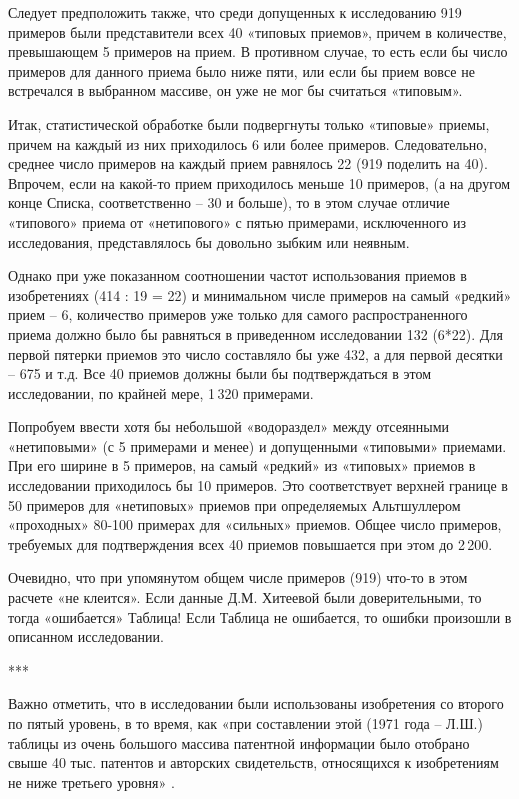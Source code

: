 \documentclass[11pt,a4paper]{article}
\begin{document}
Следует предположить также, что среди допущенных к исследованию 919 примеров
были представители всех 40 «типовых приемов», причем в количестве, превышающем
5 примеров на прием. В противном случае, то есть если бы число примеров для
данного приема было ниже пяти, или если бы прием вовсе не встречался в
выбранном массиве, он уже не мог бы считаться «типовым».

Итак, статистической обработке были подвергнуты только «типовые» приемы,
причем на каждый из них приходилось 6 или более примеров. Следовательно,
среднее число примеров на каждый прием равнялось 22 (919 поделить на 40).
Впрочем, если на какой-то прием приходилось меньше 10 примеров, (а на другом
конце Списка, соответственно -- 30 и больше), то в этом случае отличие
«типового» приема от «нетипового» с пятью примерами, исключенного из
исследования, представлялось бы довольно зыбким или неявным.

Однако при уже показанном соотношении частот использования приемов в
изобретениях (414 : 19 = 22) и минимальном числе примеров на самый «редкий»
прием -- 6, количество примеров уже только для самого распространенного приема
должно было бы равняться в приведенном исследовании 132 (6*22). Для первой
пятерки приемов это число составляло бы уже 432, а для первой десятки -- 675 и
т.д. Все 40 приемов должны были бы подтверждаться в этом исследовании, по
крайней мере, 1\,320 примерами.

Попробуем ввести хотя бы небольшой «водораздел» между отсеянными «нетиповыми»
(с 5 примерами и менее) и допущенными «типовыми» приемами. При его ширине в 5
примеров, на самый «редкий» из «типовых» приемов в исследовании приходилось бы
10 примеров. Это соответствует верхней границе в 50 примеров для «нетиповых»
приемов при определяемых Альтшуллером «проходных» 80-100 примерах для
«сильных» приемов. Общее число примеров, требуемых для подтверждения всех 40
приемов повышается при этом до 2\,200.

Очевидно, что при упомянутом общем числе примеров (919) что-то в этом расчете
«не клеится». Если данные Д.М. Хитеевой были доверительными, то тогда
«ошибается» Таблица! Если Таблица не ошибается, то ошибки произошли в
описанном исследовании.

\begin{center}  *** \end{center}

Важно отметить, что в исследовании были использованы изобретения со второго по
пятый уровень, в то время, как «при составлении этой (1971 года -- Л.Ш.)
таблицы из очень большого массива патентной информации было отобрано свыше 40
тыс. патентов и авторских свидетельств, относящихся к изобретениям не ниже
третьего уровня» \cite[стр. 57]{Altshuller1979}.
\end{document}
